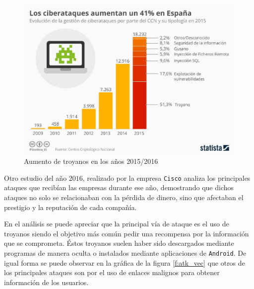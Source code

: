 \documentclass[12pt]{article}
\newcommand{\newpar} {
    \vskip 1cm
}
\begin{document}
            \begin{figure}
                \centering
                \includegraphics[width=\linewidth]{cyber_threats.png}
                \caption{Aumento de troyanos en los años 2015/2016}
                \label{f:cyber_threats}
            \end{figure}

            Otro estudio del año $2016$, realizado por la empresa \texttt{Cisco} analiza los principales ataques que recibían las empresas durante ese año, demostrando que dichos ataques no solo se relacionaban con la pérdida de dinero, sino que afectaban el prestigio y la reputación de cada compañía.

            \newpar

            En el análisis se puede apreciar que la principal vía de ataque es el uso de troyanos siendo el objetivo más común pedir una recompensa por la información que se comprometa. Éstos troyanos suelen haber sido descargados mediante programas de manera oculta o instalados mediante aplicaciones de \texttt{Android}. De igual forma se puede observar en la gráfica de la figura \ref{f:atk_vec} que otros de los principales ataques son por el uso de enlaces malignos para obtener información de los usuarios.
\end{document}
